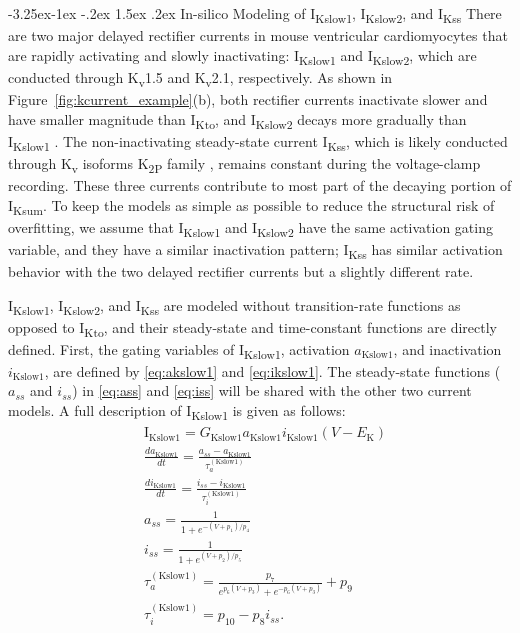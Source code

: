 \documentclass[11pt]{article}
\makeatletter
\renewcommand\subsubsection{\@startsection{subsubsection}{3}{\z@}%
                                    {-3.25ex\@plus -1ex \@minus -.2ex}%
                                     {1.5ex \@plus .2ex}%
                                     {\normalfont\normalsize\fontfamily{phv}\fontsize{14}{17}\selectfont}}
\makeatother
\begin{document}
\subsubsection{In-silico Modeling of I\textsubscript{Kslow1}, I\textsubscript{Kslow2}, and I\textsubscript{Kss}}
There are two major delayed rectifier currents in mouse ventricular cardiomyocytes that are rapidly activating and slowly inactivating: I\textsubscript{Kslow1} and I\textsubscript{Kslow2}, which are conducted through K\textsubscript{v}1.5 and K\textsubscript{v}2.1, respectively. As shown in Figure~\ref{fig:kcurrent_example}(b), both rectifier currents inactivate slower and have smaller magnitude than I\textsubscript{Kto}, and I\textsubscript{Kslow2} decays more gradually than I\textsubscript{Kslow1} \citep{liu2011dissection}. The non-inactivating steady-state current I\textsubscript{Kss}, which is likely conducted through K\textsubscript{v} isoforms K\textsubscript{2P} family \citep{feliciangeli2015family}, remains constant during the voltage-clamp recording. These three currents contribute to most part of the decaying portion of I\textsubscript{Ksum}. To keep the models as simple as possible to reduce the structural risk of overfitting, we assume that I\textsubscript{Kslow1} and I\textsubscript{Kslow2} have the same activation gating variable, and they have a similar inactivation pattern; I\textsubscript{Kss} has similar activation behavior with the two delayed rectifier currents but a slightly different rate.

I\textsubscript{Kslow1}, I\textsubscript{Kslow2}, and I\textsubscript{Kss} are modeled without transition-rate functions as opposed to I\textsubscript{Kto}, and their steady-state and time-constant functions are directly defined. First, the gating variables of I\textsubscript{Kslow1}, activation $a_{\mathrm{Kslow1}}$, and inactivation $i_{\mathrm{Kslow1}}$, are defined by \eqref{eq:akslow1} and \eqref{eq:ikslow1}. The steady-state functions ($a_{ss}$ and $i_{ss}$) in \eqref{eq:ass} and \eqref{eq:iss} will be shared with the other two current models. A full description of I\textsubscript{Kslow1} is given as follows:
\begin{align}
    &\mathrm{I}_{\mathrm{Kslow1}} = G_{\mathrm{Kslow1}}a_{\mathrm{Kslow1}}i_{\mathrm{Kslow1}}(V-E_{\mathrm{K}}) \\
    &\frac{da_{\mathrm{Kslow1}}}{dt} = \frac{a_{ss}-a_{\mathrm{Kslow1}}}{\tau_{a}^{(\mathrm{Kslow1})}} \label{eq:akslow1} \\
    &\frac{di_{\mathrm{Kslow1}}}{dt} = \frac{i_{ss}-i_{\mathrm{Kslow1}}}{\tau_{i}^{(\mathrm{Kslow1})}} \label{eq:ikslow1} \\
    &a_{ss} = \frac{1}{1+e^{-(V+p_{1})/p_{4}}} \label{eq:ass} \\
    &i_{ss} = \frac{1}{1+e^{(V+p_{2})/p_{5}}} \label{eq:iss} \\
    &\tau_{a}^{(\mathrm{Kslow1})} = \frac{p_{7}}{e^{p_{6}(V+p_{3})} + e^{-p_{6}(V+p_{3})}} + p_{9} \\
    &\tau_{i}^{(\mathrm{Kslow1})} = p_{10} - p_{8}i_{ss}.
\end{align}
\end{document}

